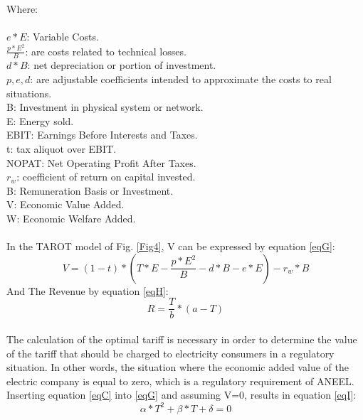 \documentclass[10pt, letterpaper]{elsarticle}
\begin{document}
Where:\\\\
$e*E$: Variable Costs.\\
$\frac{p*E^2}{B}$: are costs related to technical losses. \\
$d*B$: net depreciation or portion of investment.\\
$p, e, d$: are adjustable coefficients intended to approximate the costs to real situations.\\
B: Investment in physical system or network.\\
E: Energy sold.\\
EBIT: Earnings Before Interests and Taxes.\\
t: tax aliquot over EBIT.\\
NOPAT: Net Operating Profit After Taxes.\\
$r_w$: coefficient of return on capital invested.\\
B: Remuneration Basis or Investment.\\
V: Economic Value Added.\\
W: Economic Welfare Added.\\\\
In the TAROT model of Fig. \ref{Fig4}, V can be expressed by equation \ref{eqG}:\\
\begin{equation}
V = (1-t)*\left( T*E - \frac{p*E^2}{B} - d*B - e*E \right)   - r_w *B
\label{eqG}
\end{equation}
And The Revenue by equation \ref{eqH}:\\
\begin{equation}
R = \frac{T}{b} * (a-T)
\label{eqH}
\end{equation}\\
The calculation of the optimal tariff is necessary in order to determine the value of the tariff that should be charged to electricity consumers in a regulatory situation. In other words, the situation where the economic added value of the electric company is equal to zero, which is a regulatory requirement of ANEEL.\\
Inserting equation \ref{eqC} into \ref{eqG} and assuming V=0, results in equation \ref{eqI}:\\
\begin{equation}
\alpha * T^2 +\beta * T + \delta = 0
\label{eqI}
\end{equation}\\
\end{document}
